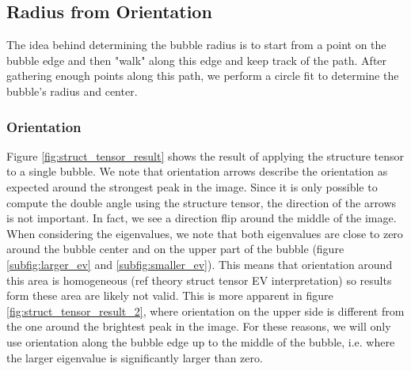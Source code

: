 		
		
	
	\subsection{Radius from Orientation}\label{radius_from_orientation}
		The idea behind determining the bubble radius is to start from a point on the bubble edge and then "walk" along this edge and keep track of the path. After gathering enough points along this path, we perform a circle fit to determine the bubble's radius and center. 
		
		\subsubsection{Orientation}
		
		Figure \ref{fig:struct_tensor_result} shows the result of applying the structure tensor to a single bubble. We note that orientation arrows describe the orientation as expected around the strongest peak in the image. Since it is only possible to compute the double angle using the structure tensor, the direction of the arrows is not important. In fact, we see a direction flip around the middle of the image. When considering the eigenvalues, we note that both eigenvalues are close to zero around the bubble center and on the upper part of the bubble (figure \ref{subfig:larger_ev} and \ref{subfig:smaller_ev}). This means that orientation around this area is homogeneous (ref theory struct tensor EV interpretation) so results form these area are likely not valid. This is more apparent in figure \ref{fig:struct_tensor_result_2}, where orientation on the upper side is different from the one around the brightest peak in the image. For these reasons, we will only use orientation along the bubble edge up to the middle of the bubble, i.e. where the larger eigenvalue is significantly larger than zero.
		
